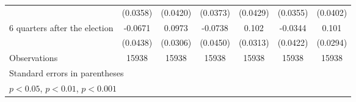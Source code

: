 \begin{table}[htbp]
\begin{tabular}{l*{6}{c}}
                    &    (0.0358)         &    (0.0420)         &    (0.0373)         &    (0.0429)         &    (0.0355)         &    (0.0402)         \\
[1em]
 6 quarters after the election&     -0.0671         &      0.0973\sym{**} &     -0.0738         &       0.102\sym{**} &     -0.0344         &       0.101\sym{***}\\
                    &    (0.0438)         &    (0.0306)         &    (0.0450)         &    (0.0313)         &    (0.0422)         &    (0.0294)         \\
\hline
Observations        &       15938         &       15938         &       15938         &       15938         &       15938         &       15938         \\
\hline\hline
\multicolumn{7}{l}{\footnotesize Standard errors in parentheses}\\
\multicolumn{7}{l}{\footnotesize \sym{*} \(p<0.05\), \sym{**} \(p<0.01\), \sym{***} \(p<0.001\)}\\
\end{tabular}
\end{table}

